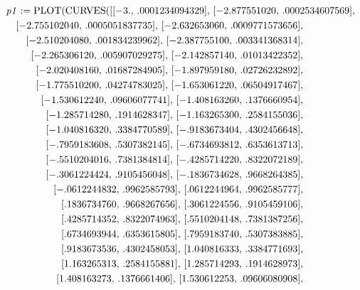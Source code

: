 \documentclass{article}
\begin{document}
\begin{maplegroup}
\begin{mapleinput}
\end{mapleinput}

\mapleresult
\begin{maplelatex}
\begin{eqnarray*}
\lefteqn{\mathit{p1} := \mathrm{PLOT}(\mathrm{CURVES}([[-3., \,
.0001234094329], \,[-2.877551020, \,.0002534607569], } \\
 & & [-2.755102040, \,.0005051837735], \,[-2.632653060, \,
.0009771573656],  \\
 & & [-2.510204080, \,.001834239962], \,[-2.387755100, \,
.003341368314],  \\
 & & [-2.265306120, \,.005907029275], \,[-2.142857140, \,
.01013422352],  \\
 & & [-2.020408160, \,.01687284905], \,[-1.897959180, \,
.02726232892],  \\
 & & [-1.775510200, \,.04274783025], \,[-1.653061220, \,
.06504917467],  \\
 & & [-1.530612240, \,.09606077741], \,[-1.408163260, \,
.1376660954],  \\
 & & [-1.285714280, \,.1914628347], \,[-1.163265300, \,
.2584155036],  \\
 & & [-1.040816320, \,.3384770589], \,[-.9183673404, \,
.4302456648],  \\
 & & [-.7959183608, \,.5307382145], \,[-.6734693812, \,
.6353613713],  \\
 & & [-.5510204016, \,.7381384814], \,[-.4285714220, \,
.8322072189],  \\
 & & [-.3061224424, \,.9105456048], \,[-.1836734628, \,
.9668264385],  \\
 & & [-.0612244832, \,.9962585793], \,[.0612244964, \,.9962585777
],  \\
 & & [.1836734760, \,.9668267656], \,[.3061224556, \,.9105459106]
,  \\
 & & [.4285714352, \,.8322074963], \,[.5510204148, \,.7381387256]
,  \\
 & & [.6734693944, \,.6353615805], \,[.7959183740, \,.5307383885]
,  \\
 & & [.9183673536, \,.4302458053], \,[1.040816333, \,.3384771693]
,  \\
 & & [1.163265313, \,.2584155881], \,[1.285714293, \,.1914628973]
,  \\
 & & [1.408163273, \,.1376661406], \,[1.530612253, \,.09606080908
],  \\

\end{eqnarray*}
\end{maplelatex}
\end{maplegroup}
\end{document}
